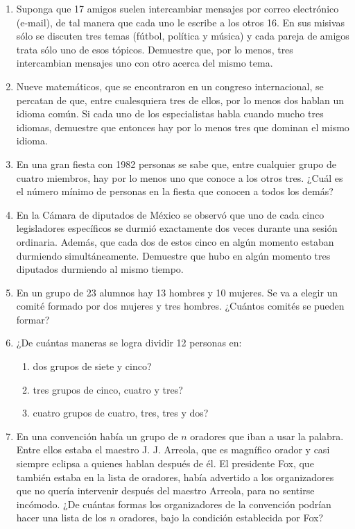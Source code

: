 \begin{Ejer}
\begin{enumerate}

\item Suponga que 17 amigos suelen intercambiar mensajes por correo electr\'onico (e-mail), de tal manera que cada uno le escribe a los otros 16. En sus misivas s\'olo se discuten tres temas (f\'utbol, pol\'itica y m\'usica) y cada pareja de amigos trata s\'olo uno de esos t\'opicos. Demuestre que, por lo menos, tres intercambian mensajes uno con otro acerca del mismo tema.

\item Nueve matem\'aticos, que se encontraron en un congreso internacional, se percatan de que, entre cualesquiera tres de ellos, por lo menos dos hablan un idioma com\'un. Si cada uno de los especialistas habla cuando mucho tres idiomas, demuestre que entonces hay por lo menos tres que dominan el mismo idioma.

\item En una gran fiesta con 1982 personas se sabe que, entre cualquier grupo de cuatro miembros, hay por lo menos uno que conoce a los otros tres. ¿Cu\'al es el n\'umero m\'inimo de personas en la fiesta que conocen a todos los dem\'as?

\item En la C\'amara de diputados de M\'exico se observ\'o que uno de cada cinco legisladores espec\'ificos se durmi\'o exactamente dos veces durante una sesi\'on ordinaria. Adem\'as, que cada dos de estos cinco en alg\'un momento estaban durmiendo simult\'aneamente. Demuestre que hubo en alg\'un momento tres diputados durmiendo al mismo tiempo.

\item En un grupo de 23 alumnos hay 13 hombres y 10 mujeres. Se va a elegir un comit\'e formado por dos mujeres y tres hombres. ¿Cu\'antos comit\'es se pueden formar?

\item ¿De cu\'antas maneras se logra dividir 12 personas en:
\begin{enumerate}
\item dos grupos de siete y cinco?
\item tres grupos de cinco, cuatro y tres?
\item cuatro grupos de cuatro, tres, tres y dos?
\end{enumerate}

\item En una convenci\'on hab\'ia un grupo de $n$ oradores que iban a usar la palabra. Entre ellos estaba el maestro J. J. Arreola, que es magn\'ifico orador y casi siempre eclipsa a quienes hablan despu\'es de \'el. El presidente Fox, que tambi\'en estaba en la lista de oradores, hab\'ia advertido a los organizadores que no quer\'ia intervenir despu\'es del maestro Arreola, para no sentirse inc\'omodo. ¿De cu\'antas formas los organizadores de la convenci\'on podr\'ian hacer una lista de los $n$ oradores, bajo la condici\'on establecida por Fox?


\end{enumerate}
\end{Ejer}
